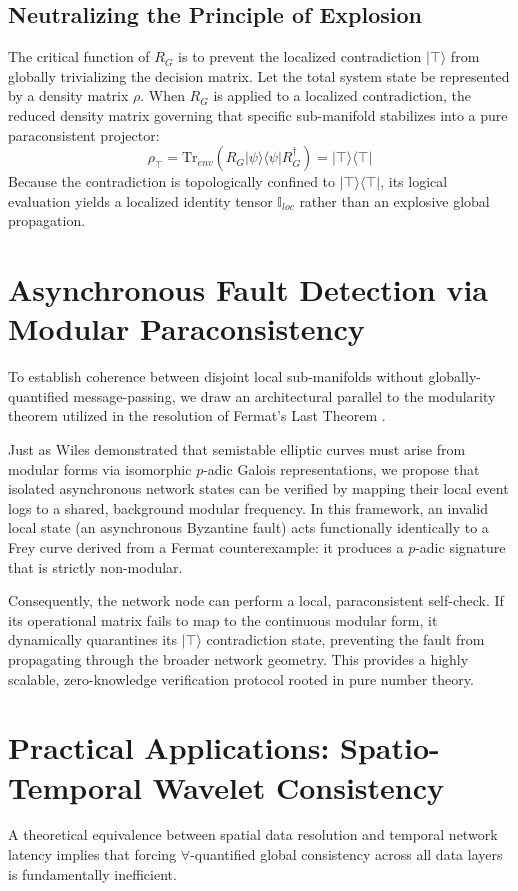 \documentclass[conference]{IEEEtran}
\newcommand{\ket}[1]{|#1\rangle}
\newcommand{\bra}[1]{\langle#1|}
\begin{document}
\subsection{Neutralizing the Principle of Explosion}
The critical function of $R_G$ is to prevent the localized contradiction $\ket{\top}$ from globally trivializing the decision matrix. Let the total system state be represented by a density matrix $\rho$. When $R_G$ is applied to a localized contradiction, the reduced density matrix governing that specific sub-manifold stabilizes into a pure paraconsistent projector:
\begin{equation}
\rho_{\top} = \text{Tr}_{env} \left( R_G \ket{\psi}\bra{\psi} R_G^\dagger \right) = \ket{\top}\bra{\top}
\end{equation}
Because the contradiction is topologically confined to $\ket{\top}\bra{\top}$, its logical evaluation yields a localized identity tensor $\mathbb{I}_{loc}$ rather than an explosive global propagation.

\section{Asynchronous Fault Detection via Modular Paraconsistency}
To establish coherence between disjoint local sub-manifolds without globally-quantified message-passing, we draw an architectural parallel to the modularity theorem utilized in the resolution of Fermat's Last Theorem \cite{wiles1995modular}. 

Just as Wiles demonstrated that semistable elliptic curves must arise from modular forms via isomorphic $p$-adic Galois representations, we propose that isolated asynchronous network states can be verified by mapping their local event logs to a shared, background modular frequency. In this framework, an invalid local state (an asynchronous Byzantine fault) acts functionally identically to a Frey curve derived from a Fermat counterexample: it produces a $p$-adic signature that is strictly non-modular. 

Consequently, the network node can perform a local, paraconsistent self-check. If its operational matrix fails to map to the continuous modular form, it dynamically quarantines its $\ket{\top}$ contradiction state, preventing the fault from propagating through the broader network geometry. This provides a highly scalable, zero-knowledge verification protocol rooted in pure number theory.

\section{Practical Applications: Spatio-Temporal Wavelet Consistency}
A theoretical equivalence between spatial data resolution and temporal network latency implies that forcing $\forall$-quantified global consistency across all data layers is fundamentally inefficient. 
\end{document}
